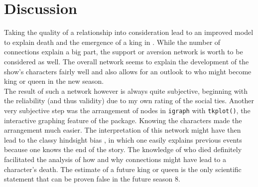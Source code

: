 \section{Discussion}
Taking the quality of a relationship into consideration lead to an improved model to explain death and the emergence of a king in \got. While the number of connections explain a big part, the support or aversion network is worth to be considered as well. The overall network seems to explain the development of the show's characters fairly well and also allows for an outlook to who might become king or queen in the new season.\\
The result of such a network however is always quite subjective, beginning with the reliability (and thus validity) due to my own rating of the social ties. Another very subjective step was the arrangement of nodes in \texttt{igraph} with \texttt{tkplot()}, the interactive graphing feature of the package. Knowing the characters made the arrangement much easier. The interpretation of this network might have then lead to the classy hindsight bias \citep{TVERSKY1973207}, in which one easily explains previous events because one knows the end of the story. The knowledge of who died definitely facilitated the analysis of how and why connections might have lead to a character's death. The estimate of a future king or queen is the only scientific statement that can be proven false in the future season 8.



